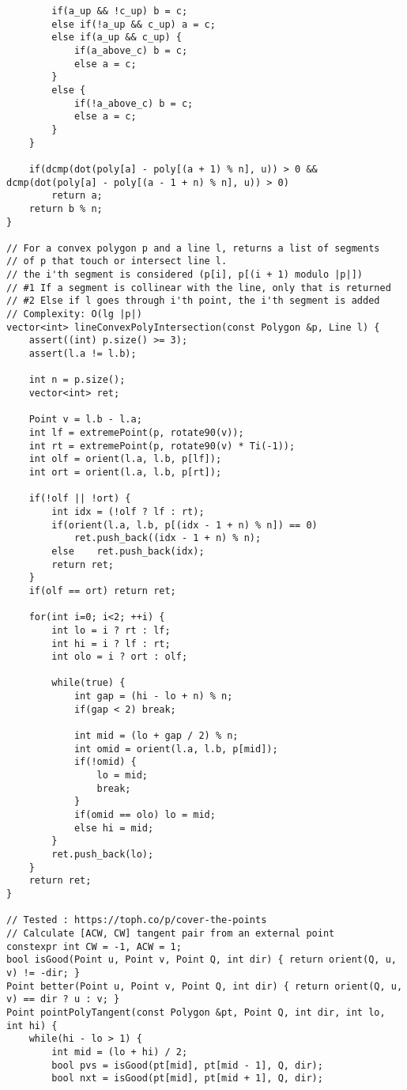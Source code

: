 \documentclass[FSZ,a4paper,onesided]{article}
\begin{document}
\begin{multicols*}{\COLS}
\begin{lstlisting}
        if(a_up && !c_up) b = c;
        else if(!a_up && c_up) a = c;
        else if(a_up && c_up) {
            if(a_above_c) b = c;
            else a = c;
        }
        else {
            if(!a_above_c) b = c;
            else a = c;
        }
    }

    if(dcmp(dot(poly[a] - poly[(a + 1) % n], u)) > 0 && dcmp(dot(poly[a] - poly[(a - 1 + n) % n], u)) > 0)
        return a;
    return b % n;
}

// For a convex polygon p and a line l, returns a list of segments
// of p that touch or intersect line l.
// the i'th segment is considered (p[i], p[(i + 1) modulo |p|])
// #1 If a segment is collinear with the line, only that is returned
// #2 Else if l goes through i'th point, the i'th segment is added
// Complexity: O(lg |p|)
vector<int> lineConvexPolyIntersection(const Polygon &p, Line l) {
    assert((int) p.size() >= 3);
    assert(l.a != l.b);

    int n = p.size();
    vector<int> ret;

    Point v = l.b - l.a;
    int lf = extremePoint(p, rotate90(v));
    int rt = extremePoint(p, rotate90(v) * Ti(-1));
    int olf = orient(l.a, l.b, p[lf]);
    int ort = orient(l.a, l.b, p[rt]);

    if(!olf || !ort) {
        int idx = (!olf ? lf : rt);
        if(orient(l.a, l.b, p[(idx - 1 + n) % n]) == 0)
            ret.push_back((idx - 1 + n) % n);
        else    ret.push_back(idx);
        return ret;
    }
    if(olf == ort) return ret;

    for(int i=0; i<2; ++i) {
        int lo = i ? rt : lf;
        int hi = i ? lf : rt;
        int olo = i ? ort : olf;

        while(true) {
            int gap = (hi - lo + n) % n;
            if(gap < 2) break;

            int mid = (lo + gap / 2) % n;
            int omid = orient(l.a, l.b, p[mid]);
            if(!omid) {
                lo = mid;
                break;
            }
            if(omid == olo) lo = mid;
            else hi = mid;
        }
        ret.push_back(lo);
    }
    return ret;
}

// Tested : https://toph.co/p/cover-the-points
// Calculate [ACW, CW] tangent pair from an external point
constexpr int CW = -1, ACW = 1;
bool isGood(Point u, Point v, Point Q, int dir) { return orient(Q, u, v) != -dir; }
Point better(Point u, Point v, Point Q, int dir) { return orient(Q, u, v) == dir ? u : v; }
Point pointPolyTangent(const Polygon &pt, Point Q, int dir, int lo, int hi) {
    while(hi - lo > 1) {
        int mid = (lo + hi) / 2;
        bool pvs = isGood(pt[mid], pt[mid - 1], Q, dir);
        bool nxt = isGood(pt[mid], pt[mid + 1], Q, dir);


\end{lstlisting}
\end{multicols*}
\end{document}
